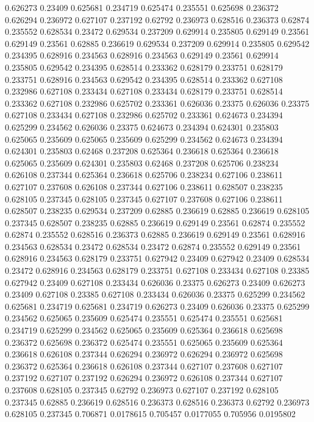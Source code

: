 0.626273 0.23409
0.625681 0.234719
0.625474 0.235551
0.625698 0.236372
0.626294 0.236972
0.627107 0.237192
0.62792 0.236973
0.628516 0.236373
0.62874 0.235552
0.628534 0.23472
0.629534 0.237209
0.629914 0.235805
0.629149 0.23561
0.629149 0.23561
0.62885 0.236619
0.629534 0.237209
0.629914 0.235805
0.629542 0.234395
0.628916 0.234563
0.628916 0.234563
0.629149 0.23561
0.629914 0.235805
0.629542 0.234395
0.628514 0.233362
0.628179 0.233751
0.628179 0.233751
0.628916 0.234563
0.629542 0.234395
0.628514 0.233362
0.627108 0.232986
0.627108 0.233434
0.627108 0.233434
0.628179 0.233751
0.628514 0.233362
0.627108 0.232986
0.625702 0.233361
0.626036 0.23375
0.626036 0.23375
0.627108 0.233434
0.627108 0.232986
0.625702 0.233361
0.624673 0.234394
0.625299 0.234562
0.626036 0.23375
0.624673 0.234394
0.624301 0.235803
0.625065 0.235609
0.625065 0.235609
0.625299 0.234562
0.624673 0.234394
0.624301 0.235803
0.62468 0.237208
0.625364 0.236618
0.625364 0.236618
0.625065 0.235609
0.624301 0.235803
0.62468 0.237208
0.625706 0.238234
0.626108 0.237344
0.625364 0.236618
0.625706 0.238234
0.627106 0.238611
0.627107 0.237608
0.626108 0.237344
0.627106 0.238611
0.628507 0.238235
0.628105 0.237345
0.628105 0.237345
0.627107 0.237608
0.627106 0.238611
0.628507 0.238235
0.629534 0.237209
0.62885 0.236619
0.62885 0.236619
0.628105 0.237345
0.628507 0.238235
0.62885 0.236619
0.629149 0.23561
0.62874 0.235552
0.62874 0.235552
0.628516 0.236373
0.62885 0.236619
0.629149 0.23561
0.628916 0.234563
0.628534 0.23472
0.628534 0.23472
0.62874 0.235552
0.629149 0.23561
0.628916 0.234563
0.628179 0.233751
0.627942 0.23409
0.627942 0.23409
0.628534 0.23472
0.628916 0.234563
0.628179 0.233751
0.627108 0.233434
0.627108 0.23385
0.627942 0.23409
0.627108 0.233434
0.626036 0.23375
0.626273 0.23409
0.626273 0.23409
0.627108 0.23385
0.627108 0.233434
0.626036 0.23375
0.625299 0.234562
0.625681 0.234719
0.625681 0.234719
0.626273 0.23409
0.626036 0.23375
0.625299 0.234562
0.625065 0.235609
0.625474 0.235551
0.625474 0.235551
0.625681 0.234719
0.625299 0.234562
0.625065 0.235609
0.625364 0.236618
0.625698 0.236372
0.625698 0.236372
0.625474 0.235551
0.625065 0.235609
0.625364 0.236618
0.626108 0.237344
0.626294 0.236972
0.626294 0.236972
0.625698 0.236372
0.625364 0.236618
0.626108 0.237344
0.627107 0.237608
0.627107 0.237192
0.627107 0.237192
0.626294 0.236972
0.626108 0.237344
0.627107 0.237608
0.628105 0.237345
0.62792 0.236973
0.627107 0.237192
0.628105 0.237345
0.62885 0.236619
0.628516 0.236373
0.628516 0.236373
0.62792 0.236973
0.628105 0.237345
0.706871 0.0178615
0.705457 0.0177055
0.705956 0.0195802
